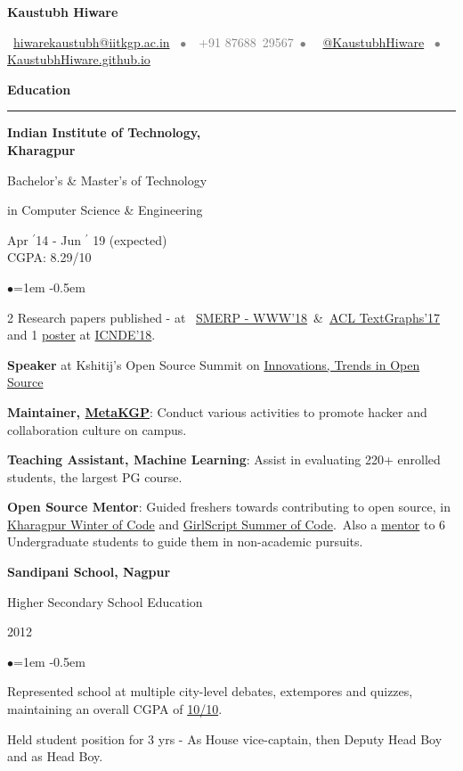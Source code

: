 \documentclass[11pt, a4paper]{resume}
\newcommand{\important}[1]{
	\textcolor{mypurple}{#1}
}
\newcommand{\greyed}[1]{
	\textcolor{gray}{#1}
}
\newcommand{\titleX}[1]{
	\begin{LARGE}
    	\important{\centerline{\textbf{#1}}}
    \end{LARGE}
}
\newcommand{\sectionTitle}[1]{
	\begin{Large}
    	\important{\textbf{#1}}
    \end{Large}
    \important{\noindent\rule{17cm}{0.4pt}} \newline
}
\newcommand\textbox[1]{
  \parbox{.333\textwidth}{#1}
}
\newenvironment{Jobsection}[3]{ %
\noindent\textbox{\bf #1\hfill}\textbox{\hfil #2\hfil}\textbox{\hfill #3}
  \begin{list}{$\bullet$}{\leftmargin=1em} %
   \itemsep -0.5em \vspace{-0.5em} %
  }{
  \end{list}
  \vspace{0.5em} %
}
\begin{document}
\titleX{Kaustubh Hiware}
\normalsize
\vspace{6pt}
\greyed{\centerline{\faEnvelopeO \, \href{mailto:hiwarekaustubh@iitkgp.ac.in}{ 
hiwarekaustubh@iitkgp.ac.in} \, $\bullet$ \,\faMobile\, +91 87688\, 29567\, $\bullet$ \, 
\faTwitter \, \href{https://twitter.com/kaustubhhiware}{@KaustubhHiware} \, $\bullet$ \, 
\faGlobe \, \href{https://kaustubhhiware.github.io}{KaustubhHiware.github.io}
}}

\vspace{-2em}
\sectionTitle{Education}
\begin{Jobsection}{Indian Institute of Technology,\\ Kharagpur}{Bachelor's \& Master's of 
Technology \centerline{in Computer Science \& Engineering}}{Apr $^{\prime}$14 - Jun 
$^{\prime}$ 19 (expected) \\\hspace*{\fill} CGPA: 8.29/10}
\item 2 Research papers published - at \, 
\href{https://www.cse.iitk.ac.in/users/kripa/smerp2018/}{SMERP - WWW'18} \,\&\, 
\href{https://sites.google.com/site/textgraphs2017/program}{ACL TextGraphs'17} and 1 
\href{https://drive.google.com/file/d/1fCH2AAAHWp5JLwQxLNGoOYoGnyWrolHf/view?usp=sharing}{poster} 
at \href{http://cse.iitkgp.ac.in/conf/NSDE/sds/ICNDE2018/pages/selected.html}{ICNDE'18}. 
\item {\bf Speaker} at Kshitij's Open Source Summit on 
\href{https://www.youtube.com/watch?v=lk4ciY3NSbA}{Innovations, Trends in Open Source}
\item {\bf Maintainer, \href{http://metakgp.github.io}{MetaKGP}}: Conduct various activities 
to promote hacker and collaboration culture on campus.
\item {\bf Teaching Assistant, Machine Learning}: Assist in evaluating 220+ enrolled 
students, the largest PG course.
\item {\bf Open Source Mentor}: Guided freshers towards contributing to open source, in 
\href{https://kwoc.kossiitkgp.in/}{Kharagpur Winter of Code} and 
\href{https://gssoc.tech/projects.html#facebook-archive}{GirlScript Summer of Code}.\, Also 
a 
\href{https://drive.google.com/file/d/0B5iU6cWw36rOc0gzcjZPRTd5SkU/view?usp=sharing}{mentor} 
to 6 Undergraduate students to guide them in non-academic pursuits.
\end{Jobsection}

\begin{Jobsection}{Sandipani School, Nagpur}{Higher Secondary School Education}{2012}
\item Represented school at multiple city-level debates, extempores and quizzes, maintaining 
an overall CGPA of 
\href{https://drive.google.com/file/d/0B5iU6cWw36rOdGpVVVBHUWVkajg/view?usp=sharing}{10/10}.
\item Held student position for 3 yrs - As House vice-captain, then Deputy Head Boy and as 
Head Boy.
\end{Jobsection}
\end{document}
